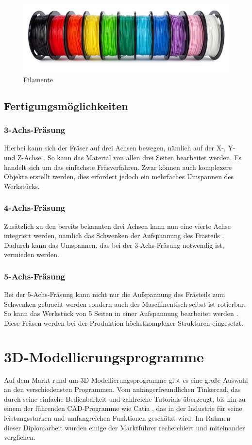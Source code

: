 \begin{figure}[H]
	\centering
	\includegraphics[width=0.5\linewidth]{images/Filamente.jpg}
	\caption[Filamente]{Filamente}
	\label{fig:Kunststoff Filamente}
\end{figure}


\subsection{Fertigungsmöglichkeiten}

\subsubsection{3-Achs-Fräsung}
Hierbei kann sich der Fräser auf drei Achsen bewegen, nämlich auf der X-, Y- und Z-Achse \parencite{Fraesen345Achs}. So kann das Material von allen drei Seiten bearbeitet werden. Es handelt sich um das einfachste Fräsverfahren. Zwar können auch komplexere Objekte erstellt werden, dies erfordert jedoch ein mehrfaches Umspannen des Werkstücks.

\subsubsection{4-Achs-Fräsung}
Zusätzlich zu den bereits bekannten drei Achsen kann nun eine vierte Achse integriert werden, nämlich das Schwenken der Aufspannung des Frästeils \parencite{Fraesen345Achs}. Dadurch kann das Umspannen, das bei der 3-Achs-Fräsung notwendig ist, vermieden werden.

\subsubsection{5-Achs-Fräsung}
Bei der 5-Achs-Fräsung kann nicht nur die Aufspannung des Frästeils zum Schwenken gebracht werden sondern auch der Maschinentisch selbst ist rotierbar. So kann das Werkstück von 5 Seiten in einer Aufspannung bearbeitet werden \parencite{Fraesen345Achs}. Diese Fräsen werden bei der Produktion höchstkomplexer Strukturen eingesetzt.\\

\newpage

\section{3D-Modellierungsprogramme}
Auf dem Markt rund um 3D-Modellierungsprogramme gibt es eine große Auswahl an den verschiedensten Programmen. Vom anfängerfreundlichen Tinkercad, das durch seine einfache Bedienbarkeit und zahlreiche Tutorials überzeugt, bis hin zu einem der führenden CAD-Programme wie Catia  \parencite{3DPrintingSoftware}, das in der Industrie für seine leistungsstarken und umfangreichen Funktionen geschätzt wird. \parencite{CADProgramme} Im Rahmen dieser Diplomarbeit wurden einige der Marktführer recherchiert und miteinander verglichen. \\



